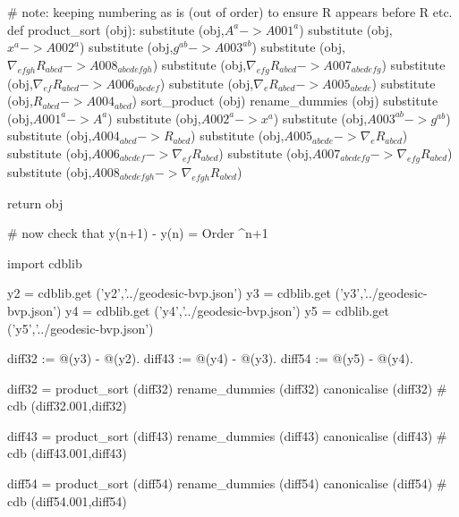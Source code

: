 \documentclass[12pt]{cdblatex}
\begin{document}
\begin{cadabra}
   # note: keeping numbering as is (out of order) to ensure R appears before \nabla R etc.
   def product_sort (obj):
       substitute (obj,$ A^{a}                            -> A001^{a}               $)
       substitute (obj,$ x^{a}                            -> A002^{a}               $)
       substitute (obj,$ g^{a b}                          -> A003^{a b}             $)
       substitute (obj,$ \nabla_{e f g h}{R_{a b c d}}    -> A008_{a b c d e f g h} $)
       substitute (obj,$ \nabla_{e f g}{R_{a b c d}}      -> A007_{a b c d e f g}   $)
       substitute (obj,$ \nabla_{e f}{R_{a b c d}}        -> A006_{a b c d e f}     $)
       substitute (obj,$ \nabla_{e}{R_{a b c d}}          -> A005_{a b c d e}       $)
       substitute (obj,$ R_{a b c d}                      -> A004_{a b c d}         $)
       sort_product   (obj)
       rename_dummies (obj)
       substitute (obj,$ A001^{a}                  -> A^{a}                         $)
       substitute (obj,$ A002^{a}                  -> x^{a}                         $)
       substitute (obj,$ A003^{a b}                -> g^{a b}                       $)
       substitute (obj,$ A004_{a b c d}            -> R_{a b c d}                   $)
       substitute (obj,$ A005_{a b c d e}          -> \nabla_{e}{R_{a b c d}}       $)
       substitute (obj,$ A006_{a b c d e f}        -> \nabla_{e f}{R_{a b c d}}     $)
       substitute (obj,$ A007_{a b c d e f g}      -> \nabla_{e f g}{R_{a b c d}}   $)
       substitute (obj,$ A008_{a b c d e f g h}    -> \nabla_{e f g h}{R_{a b c d}} $)

       return obj

   # now check that y(n+1) - y(n) = Order \eps^{n+1}

   import cdblib

   y2 = cdblib.get ('y2','../geodesic-bvp.json')
   y3 = cdblib.get ('y3','../geodesic-bvp.json')
   y4 = cdblib.get ('y4','../geodesic-bvp.json')
   y5 = cdblib.get ('y5','../geodesic-bvp.json')

   diff32 := @(y3) - @(y2).
   diff43 := @(y4) - @(y3).
   diff54 := @(y5) - @(y4).

   diff32 = product_sort (diff32)
   rename_dummies        (diff32)
   canonicalise          (diff32)         # cdb (diff32.001,diff32)

   diff43 = product_sort (diff43)
   rename_dummies        (diff43)
   canonicalise          (diff43)         # cdb (diff43.001,diff43)

   diff54 = product_sort (diff54)
   rename_dummies        (diff54)
   canonicalise          (diff54)         # cdb (diff54.001,diff54)


\end{cadabra}
\end{document}
